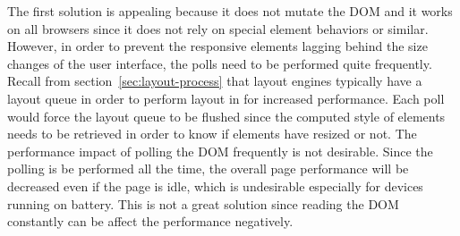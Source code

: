 \documentclass[a4paper,11pt]{kth-mag}
\begin{document}
          The first solution is appealing because it does not mutate the \gls{DOM} and it works on all \glspl{browser} since it does not rely on special \gls{element} behaviors or similar.
          However, in order to prevent the \gls{responsive} \glspl{element} lagging behind the size changes of the user interface, the polls need to be performed quite frequently.
          Recall from section~\ref{sec:layout-process} that \glspl{layout engine} typically have a layout queue in order to perform layout in  for increased performance.
          Each poll would force the layout queue to be flushed since the computed style of \glspl{element} needs to be retrieved in order to know if \glspl{element} have resized or not.
          The performance impact of polling the \gls{DOM} frequently is not desirable.
          Since the polling is be performed all the time, the overall page performance will be decreased even if the page is idle, which is undesirable especially for devices running on battery.
          This is not a great solution since reading the \gls{DOM} constantly can be affect the performance negatively. 
\end{document}
